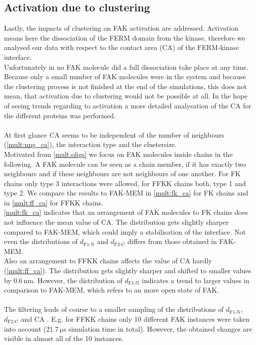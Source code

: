 \subsection{Activation due to clustering}
Lastly, the impacts of clustering on FAK activation are addressed. Activation means here the dissociation of the FERM domain from the kinase, therefore we analysed our data with respect to the contact area (CA) of the FERM-kinase interface.\\
Unfortunately in no FAK molecule did a full dissociation take place at any time. Because only a small number of FAK molecules were in the system and because the clustering process is not finished at the end of the simulations, this does not mean, that activation due to clustering would not be possible at all. In the hope of seeing trends regarding to activation a more detailed analysation of the CA for the different proteins was performed.\\
\\
At first glance CA seems to be independent of the number of neighbours (\autoref{mult:nng_ca}), the interaction type and the clustersize.\\
Motivated from \autoref{mult:oligs} we focus on FAK molecules inside chains in the following. A FAK molecule can be seen as a chain member, if it has exactly two neighbours and if these neighbours are not neighbours of one another. For FK chains only type 3 interactions were allowed, for FFKK chains both, type 1 and type 2. We compare the results to FAK-MEM in \autoref{mult:fk_ca} for FK chains and in \autoref{mult:ff_ca} for FFKK chains.\\
\autoref{mult:fk_ca} indicates that an arrangement of FAK molecules to FK chains does not influence the mean value of CA. The distribution gets slightly sharper compared to FAK-MEM, which could imply a stabilisation of the interface. Not even the distributions of $d_\text{F1-N}$ and $d_\text{F2-C}$ differs from those obtained in FAK-MEM.\\
Also an arrangement to FFKK chains affects the value of CA hardly (\autoref{mult:ff_ca}). The distribution gets slightly sharper and shifted to smaller values by $0.6\,\si{\nano\metre}$. However, the distribution of $d_\text{F1-N}$ indicates a trend to larger values in comparison to FAK-MEM, which refers to an more open state of FAK.\\
\\
The filtering leads of course to a smaller sampling of the distributions of $d_\text{F1-N}$, $d_\text{F2-C}$ and CA . E.g. for FFKK chains only 10 different FAK instances were taken into account ($21.7\,\si{\micro\second}$ simulation time in total). However, the obtained changes are visible in almost all of the 10 instances.
